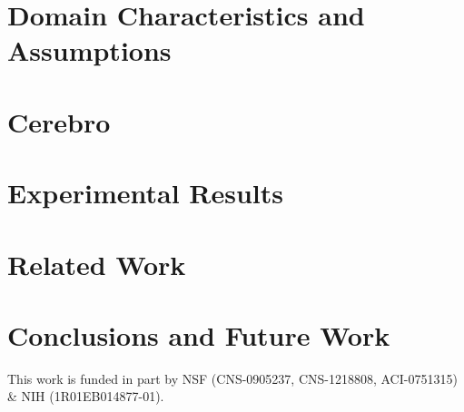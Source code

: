 \documentclass[10pt,reprint]{socc14}
\begin{document}
\vspace{-0.10in}
\section{Domain Characteristics and Assumptions}
\label{sec:approach}



\vspace{-0.10in}
\section{Cerebro}
\label{sec:design}
%


%

\vspace{-0.10in}
\section{Experimental Results}
\label{sec:results}


\vspace{-0.10in}
\section{Related Work}
\label{sec:related_work}


\vspace{-0.10in}
\section{Conclusions and Future Work}
\label{sec:conclusions}




\acks
This work is funded in part by NSF (CNS-0905237, CNS-1218808, ACI-0751315) \& NIH
(1R01EB014877-01).


\softraggedright





\end{document}
